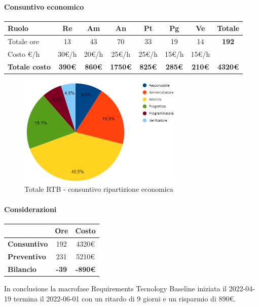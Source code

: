 \paragraph{Consuntivo economico}
\begin{center}
	\renewcommand{\arraystretch}{1.8}
	\begin{tabular}{ |m{6em}|c|c|c|c|c|c|c| }
	\hline
	\textbf{Ruolo} & \textbf{Re} & \textbf{Am} &  \textbf{An} &  \textbf{Pt} &  \textbf{Pg} &  \textbf{Ve} &  \textbf{Totale}\\
    \hline
    Totale ore & 13 & 43 & 70 & 33 & 19 & 14 & \textbf{192}\\
    \hline
    Costo \euro/h & 30\euro/h & 20\euro/h & 25\euro/h & 25\euro/h & 15\euro/h & 15\euro/h & \\
    \hline
    \textbf{Totale costo} & \textbf{390\euro} & \textbf{860\euro} &  \textbf{1750\euro} &  \textbf{825\euro} &  \textbf{285\euro} &  \textbf{210\euro} &  \textbf{4320\euro}\\
    \hline
	\end{tabular}

    \begin{figure}[H]
        \centering\includegraphics[width=0.7\textwidth, height=0.7\textheight, keepaspectratio]{images/consuntivo/RTB-costo.png}
        \caption{Totale RTB - consuntivo ripartizione economica}
    \end{figure}
\end{center}

\paragraph{Considerazioni} \hfill \break
\begin{center}
	\renewcommand{\arraystretch}{1.8}
	\begin{tabular}{ | l |c|c| }
    \hline
    & \textbf{Ore} & \textbf{Costo} \\
	\hline
    \textbf{Consuntivo} & 192 & 4320\euro \\
    \hline
    \textbf{Preventivo} & 231 & 5210\euro \\
    \hline
    \textbf{Bilancio} & \textbf{-39} & \textbf{-890\euro} \\
    \hline
    \end{tabular}
\end{center}
In conclusione la macrofase Requirements Tecnology Baseline iniziata il 2022-04-19 termina il 2022-06-01 con un ritardo di 9 giorni e un risparmio di 890\euro.


